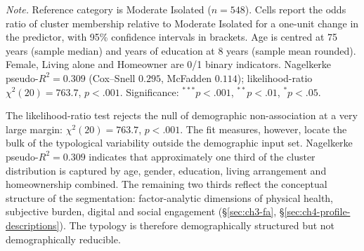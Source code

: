 \begin{table}[!htbp]
\centering
\caption[Multinomial regression of cluster membership, Italy]{Multinomial logistic regression of cluster membership on demographic predictors, Italy ($n = 2{,}188$)}
\label{tab:ch4-multinomial}
\small
\setlength{\tabcolsep}{4pt}
\renewcommand{\arraystretch}{1.15}

\medskip
\footnotesize
\textit{Note.} Reference category is Moderate Isolated ($n = 548$). Cells report the odds ratio of cluster membership relative to Moderate Isolated for a one-unit change in the predictor, with 95\% confidence intervals in brackets. Age is centred at 75 years (sample median) and years of education at 8 years (sample mean rounded). Female, Living alone and Homeowner are 0/1 binary indicators. Nagelkerke pseudo-$R^{2} = 0.309$ (Cox--Snell $0.295$, McFadden $0.114$); likelihood-ratio $\chi^{2}(20) = 763.7$, $p < .001$. Significance: $^{***} p < .001$, $^{**} p < .01$, $^{*} p < .05$.
\end{table}
\FloatBarrier

The likelihood-ratio test rejects the null of demographic non-association at a very large margin: $\chi^{2}(20) = 763.7$, $p < .001$. The fit measures, however, locate the bulk of the typological variability outside the demographic input set. Nagelkerke pseudo-$R^{2} = 0.309$ indicates that approximately one third of the cluster distribution is captured by age, gender, education, living arrangement and homeownership combined. The remaining two thirds reflect the conceptual structure of the segmentation: factor-analytic dimensions of physical health, subjective burden, digital and social engagement (\S\ref{sec:ch3-fa}, \S\ref{sec:ch4-profile-descriptions}). The typology is therefore demographically structured but not demographically reducible.

